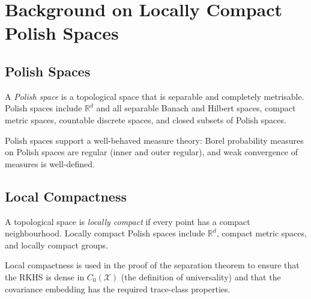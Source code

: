 \documentclass[12pt, oneside]{book}
\theoremstyle{plain}
\theoremstyle{definition}
\newcommand{\R}{\mathbb{R}}
\newcommand{\calX}{\mathcal{X}}
\begin{document}
\chapter{Background on Locally Compact Polish Spaces}
\label{app:topology}

\section{Polish Spaces}

A \emph{Polish space} is a topological space that is separable and completely metrisable. Polish spaces include $\R^d$ and all separable Banach and Hilbert spaces, compact metric spaces, countable discrete spaces, and closed subsets of Polish spaces.

Polish spaces support a well-behaved measure theory: Borel probability measures on Polish spaces are regular (inner and outer regular), and weak convergence of measures is well-defined.

\section{Local Compactness}

A topological space is \emph{locally compact} if every point has a compact neighbourhood. Locally compact Polish spaces include $\R^d$, compact metric spaces, and locally compact groups.

Local compactness is used in the proof of the separation theorem to ensure that the RKHS is dense in $C_0(\calX)$ (the definition of universality) and that the covariance embedding has the required trace-class properties.


\backmatter
\end{document}
